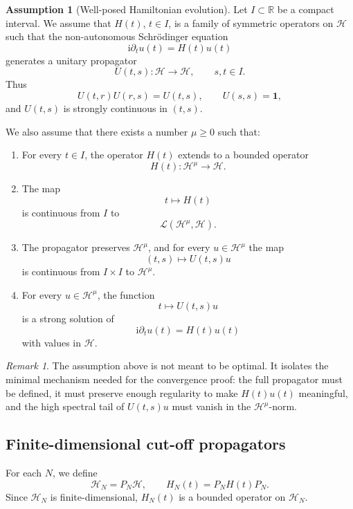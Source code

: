 \documentclass[11pt]{amsart}
\theoremstyle{plain}
\theoremstyle{definition}
\newtheorem{assumption}[theorem]{Assumption}
\theoremstyle{remark}
\newtheorem{remark}[theorem]{Remark}
\newcommand{\Hilb}{\mathcal H}
\newcommand{\Id}{\mathbf 1}
\newcommand{\ii}{\mathrm i}
\begin{document}
\begin{assumption}[Well-posed Hamiltonian evolution]
\label{ass:full-dynamics}
Let \(I\subset\mathbb R\) be a compact interval.  We assume that
\(H(t)\), \(t\in I\), is a family of symmetric operators on \(\Hilb\)
such that the non-autonomous Schr\"odinger equation
\[
        \ii\partial_t u(t)=H(t)u(t)
\]
generates a unitary propagator
\[
        U(t,s):\Hilb\to\Hilb,
        \qquad s,t\in I.
\]
Thus
\[
        U(t,r)U(r,s)=U(t,s),
        \qquad
        U(s,s)=\Id,
\]
and \(U(t,s)\) is strongly continuous in \((t,s)\).

We also assume that there exists a number \(\mu\geq0\) such that:

\begin{enumerate}[label=\textup{(\roman*)}]
\item
For every \(t\in I\), the operator \(H(t)\) extends to a bounded
operator
\[
        H(t):\Hilb^\mu\longrightarrow \Hilb.
\]

\item
The map
\[
        t\longmapsto H(t)
\]
is continuous from \(I\) to
\[
        \mathcal L(\Hilb^\mu,\Hilb).
\]

\item
The propagator preserves \(\Hilb^\mu\), and for every \(u\in\Hilb^\mu\)
the map
\[
        (t,s)\longmapsto U(t,s)u
\]
is continuous from \(I\times I\) to \(\Hilb^\mu\).

\item
For every \(u\in\Hilb^\mu\), the function
\[
        t\longmapsto U(t,s)u
\]
is a strong solution of
\[
        \ii\partial_t u(t)=H(t)u(t)
\]
with values in \(\Hilb\).
\end{enumerate}
\end{assumption}

\begin{remark}
The assumption above is not meant to be optimal.  It isolates the
minimal mechanism needed for the convergence proof: the full propagator
must be defined, it must preserve enough regularity to make \(H(t)u(t)\)
meaningful, and the high spectral tail of \(U(t,s)u\) must vanish in the
\(\Hilb^\mu\)-norm.
\end{remark}

\subsection{Finite-dimensional cut-off propagators}

For each \(N\), we define
\[
        \Hilb_N=P_N\Hilb,
        \qquad
        H_N(t)=P_NH(t)P_N.
\]
Since \(\Hilb_N\) is finite-dimensional, \(H_N(t)\) is a bounded
operator on \(\Hilb_N\).
\end{document}
